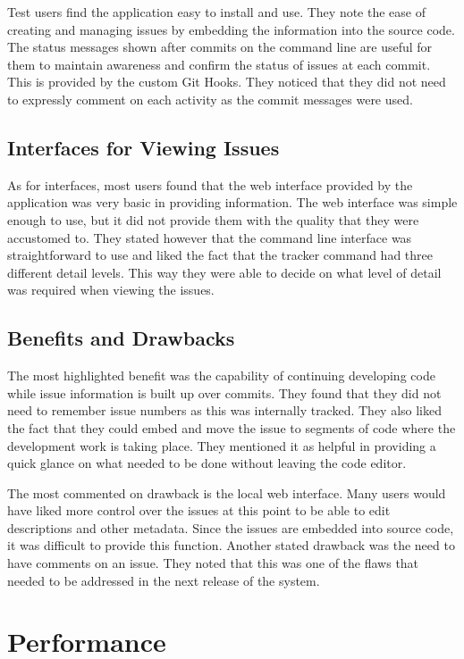 \documentclass{mproj}
\begin{document}
Test users find the application easy to install and use. They note the ease of creating and managing issues by embedding the information into the source code. The status messages shown after commits on the command line are useful for them to maintain awareness and confirm the status of issues at each commit. This is provided by the custom Git Hooks. They noticed that they did not need to expressly comment on each activity as the commit messages were used.

\subsection{Interfaces for Viewing Issues}

As for interfaces, most users found that the web interface provided by the application was very basic in providing information. The web interface was simple enough to use, but it did not provide them with the quality that they were accustomed to. They stated however that the command line interface was straightforward to use and liked the fact that the tracker command had three different detail levels. This way they were able to decide on what level of detail was required when viewing the issues.

\subsection{Benefits and Drawbacks}

The most highlighted benefit was the capability of continuing developing code while issue information is built up over commits. They found that they did not need to remember issue numbers as this was internally tracked. They also liked the fact that they could embed and move the issue to segments of code where the development work is taking place. They mentioned it as helpful in providing a quick glance on what needed to be done without leaving the code editor.

The most commented on drawback is the local web interface. Many users would have liked more control over the issues at this point to be able to edit descriptions and other metadata. Since the issues are embedded into source code, it was difficult to provide this function. Another stated drawback was the need to have comments on an issue. They noted that this was one of the flaws that needed to be addressed in the next release of the system.


\section{Performance}
\end{document}

